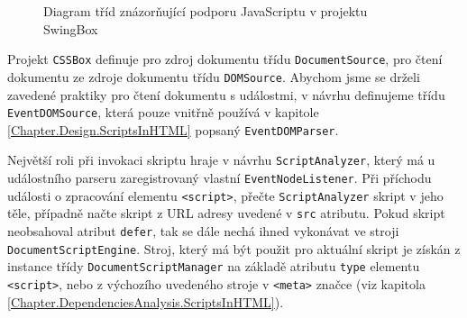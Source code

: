 \begin{figure}[H]
  \begin{center}
    \caption{Diagram tříd znázorňující podporu JavaScriptu v projektu SwingBox}
    \label{Figure.ScriptsInSwingBoxDesign}
  \end{center}
\end{figure}

Projekt \texttt{CSSBox} definuje pro zdroj dokumentu třídu \texttt{DocumentSource}, pro čtení dokumentu ze zdroje dokumentu třídu \texttt{DOMSource}. Abychom jsme se drželi zavedené praktiky pro čtení dokumentu s událostmi, v návrhu definujeme třídu \texttt{EventDOMSource}, která pouze vnitřně používá v kapitole \ref{Chapter.Design.ScriptsInHTML} popsaný \texttt{EventDOMParser}. 

Největší roli při invokaci skriptu hraje v návrhu \texttt{ScriptAnalyzer}, který má u událostního parseru zaregistrovaný vlastní \texttt{EventNodeListener}. Při příchodu události o zpracování elementu \texttt{<script>}, přečte \texttt{ScriptAnalyzer} skript v jeho těle, případně načte skript z URL adresy uvedené v \texttt{src} atributu. Pokud skript neobsahoval atribut \texttt{defer}, tak se dále nechá ihned vykonávat ve stroji \texttt{DocumentScriptEngine}. Stroj, který má být použit pro aktuální skript je získán z instance třídy \texttt{DocumentScriptManager} na základě atributu \texttt{type} elementu \texttt{<script>}, nebo z výchozího uvedeného stroje v \texttt{<meta>} značce (viz kapitola \ref{Chapter.DependenciesAnalysis.ScriptsInHTML}).

